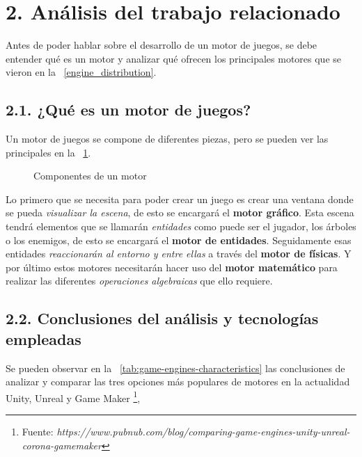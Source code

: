 \chapter*{2. Análisis del trabajo relacionado}\label{cap:analysis}

Antes de poder hablar sobre el desarrollo de un motor de juegos, se debe entender qué es un motor y analizar qué ofrecen los principales
motores que se vieron en la \figurename~\ref{engine_distribution}. 

\section*{2.1. ¿Qué es un motor de juegos?}\label{sec:game-engine}

Un motor de juegos se compone de diferentes piezas, pero se pueden ver las principales en la \figurename~\ref{engine_components}.

\begin{figure}[h!]
    \centering
    \caption{Componentes de un motor}
    \label{engine_components}
\end{figure}

Lo primero que se necesita para poder crear un juego es crear una ventana donde se pueda \textit{visualizar la escena}, 
de esto se encargará el \textbf{motor gráfico}. Esta escena tendrá elementos que se llamarán \textit{entidades} como puede ser el jugador,
los árboles o los enemigos, de esto se encargará el \textbf{motor de entidades}. Seguidamente esas entidades \textit{reaccionarán al
entorno y entre ellas} a través del \textbf{motor de físicas}. Y por último estos motores necesitarán hacer uso del \textbf{motor matemático}
para realizar las diferentes \textit{operaciones algebraicas} que ello requiere.

\newpage

\section*{2.2. Conclusiones del análisis y tecnologías empleadas}\label{sec:technologies}

Se pueden observar en la \tablename~\ref{tab:game-engines-characteristics} las conclusiones de analizar y comparar las tres opciones más populares de motores en la actualidad Unity\cite{unity}, Unreal\cite{unreal} y Game Maker\cite{gamemaker} \footnote{Fuente: \textit{https://www.pubnub.com/blog/comparing-game-engines-unity-unreal-corona-gamemaker}}, 

